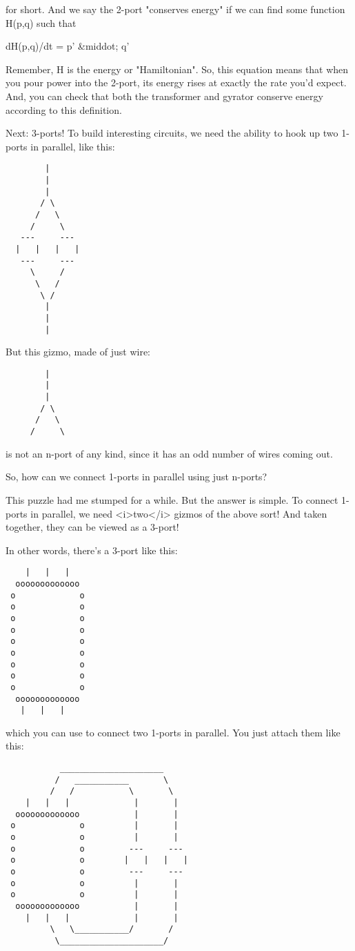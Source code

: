 for short.  And we say the 2-port "conserves energy" if we can find 
some function H(p,q) such that

dH(p,q)/dt = p' &middot; q'

Remember, H is the energy or "Hamiltonian".  So, this equation means
that when you pour power into the 2-port, its energy rises at exactly
the rate you'd expect.  And, you can check that both the transformer
and gyrator conserve energy according to this definition.

Next: 3-ports!  To build interesting circuits, we need the ability to
hook up two 1-ports in parallel, like this:

\begin{verbatim}
        |
        |
        |
       / \
      /   \
     /     \
   ---     ---
  |   |   |   |
   ---     ---
     \     /
      \   /
       \ /
        |
        |
        |
\end{verbatim}
    
But this gizmo, made of just wire:

\begin{verbatim}
        |
        |
        |
       / \
      /   \
     /     \

\end{verbatim}
    
is not an n-port of any kind, since it has an odd number of wires
coming out.

So, how can we connect 1-ports in parallel using just n-ports?

This puzzle had me stumped for a while.  But the answer is simple.  To
connect 1-ports in parallel, we need <i>two</i> gizmos of the above
sort!  And taken together, they can be viewed as a 3-port!

In other words, there's a 3-port like this:

\begin{verbatim}
    |   |   |
  ooooooooooooo
 o             o
 o             o
 o             o
 o             o
 o             o
 o             o
 o             o
 o             o
 o             o
  ooooooooooooo
   |   |   |
\end{verbatim}
    

which you can use to connect two 1-ports in parallel.  You just attach
them like this:

\begin{verbatim}
           _____________________
          /   ___________       \
         /   /           \       \
    |   |   |             |       |
  ooooooooooooo           |       |
 o             o          |       |
 o             o          |       |
 o             o         ---     ---
 o             o        |   |   |   |
 o             o         ---     ---
 o             o          |       |
 o             o          |       |
  ooooooooooooo           |       |
    |   |   |             |       |
         \   \___________/       /  
          \_____________________/    
\end{verbatim}
    

